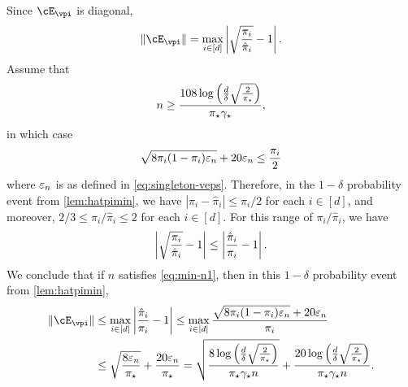 Since $\errp$ is diagonal,
\begin{align*}
  \norm{\errp}
  = \max_{i\in[d]}
  \Abs{
    \sqrt{\frac{\pi_i}{\hat\pi_i}} - 1
  }
  .
\end{align*}
Assume that
\begin{equation}
  n \geq \frac{108 \log\left(\frac{d}\delta\sqrt{\frac{2}{\pi_{\star}}}\right)
  }{\pi_{\star}\gamma_{\star}}
  ,
  \label{eq:min-n1}
\end{equation}
in which case
\[
  \sqrt{8\pi_i(1-\pi_i) \varepsilon_n} + 20\varepsilon_n
  \leq \frac{\pi_i}{2}
\]
where $\varepsilon_n$ is as defined in \cref{eq:singleton-veps}.
Therefore, in the $1-\delta$ probability event from
\cref{lem:hatpimin}, we have $|\pi_i - \hat\pi_i| \leq \pi_i/2$ for
each $i \in [d]$, and moreover, $2/3 \leq \pi_i/\hat\pi_i \leq 2$ for
each $i \in [d]$.
For this range of $\pi_i/\hat\pi_i$, we have
\[
  \left| \sqrt{\frac{\pi_i}{\hat\pi_i}} - 1 \right|
  \leq 
  \left| \frac{\hat\pi_i}{\pi_i} - 1 \right|
  .
\]
We conclude that if $n$ satisfies \cref{eq:min-n1}, then in this
$1-\delta$ probability event from \cref{lem:hatpimin},
\begin{align}
  \norm{\errp}
  & \leq
  \max_{i \in [d]}
  \Abs{
    \frac{\hat\pi_i}{\pi_i} - 1
  }
  \leq
  \max_{i \in [d]}
  \frac{
    \sqrt{8\pi_i(1-\pi_i) \veps_n} + 20 \veps_n
  }{\pi_i}
  \notag \\
  & \leq
  \sqrt{\frac{8\veps_n}{\pimin}} + \frac{20\veps_n}{\pimin}
  =
  \sqrt{
    \frac{
      8\log\Parens{\frac{d}\delta\sqrt{\frac{2}{\pimin}}}
    }{
      \pimin\gap n
    }
  }
  +
  \frac{
    20\log\Parens{\frac{d}\delta\sqrt{\frac{2}{\pimin}}}
  }{
    \pimin\gap n
  }
  .
  \label{eq:singletonbound}
\end{align}

%
%

